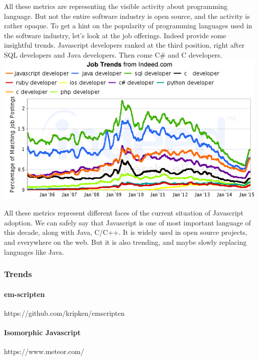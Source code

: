 All these metrics are representing the visible activity about programming language.
But not the entire software industry is open source, and the activity is rather opaque.
To get a hint on the popularity of programming languages used in the software industry, let's look at the job offerings.
Indeed provide some insightful trends.
Javascript developers ranked at the third position, right after SQL developers and Java developers.
Then come C\# and C developers.
\includegraphics[width=\linewidth]{../../data/js-trends/jobgraph}

All these metrics represent different faces of the current situation of Javascript adoption.
We can safely say that Javascript is one of most important language of this decade, along with Java, C/C++.
It is widely used in open source projects, and everywhere on the web.
But it is also trending, and maybe slowly replacing languages like Java.

\subsubsection{Trends}


\paragraph{em-scripten}

https://github.com/kripken/emscripten

\paragraph{Isomorphic Javascript}

https://www.meteor.com/

